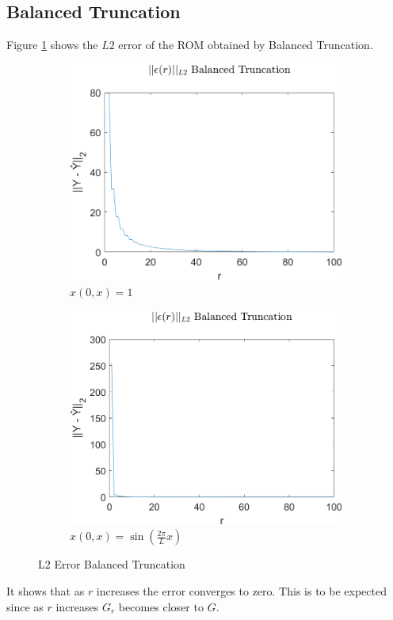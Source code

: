 \subsection{Balanced Truncation}
Figure \ref{FIG-ERR-BT} shows the \(L2\) error of the ROM obtained by Balanced Truncation.


\begin{figure}[H]
\begin{subfigure}[b]{0.5\textwidth}
\centering
\includegraphics[width=\textwidth]{images/L2_BT}
\caption{$x(0, x) = 1$}
\label{FIG-ERR-BT}
\end{subfigure}
\begin{subfigure}[b]{0.5\textwidth}
\centering
\includegraphics[width=\textwidth]{images/L2_BT_SIN}
\caption{$x(0, x) = \sin(\frac{2\pi}{L}x)$}
\label{FIG-ERR-BT-SIN}
\end{subfigure}
\caption{L2 Error Balanced Truncation}
\end{figure}
It shows that as \(r\) increases the error converges to zero.
This is to be expected since as \(r\) increases \(G_r\) becomes closer to \(G\).

